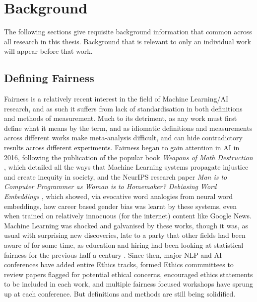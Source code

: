 \chapter{Background}\label{chapter:background}

The following sections give requisite background information that common across all research in this thesis. Background that is relevant to only an individual work will appear before that work.

\section{Defining Fairness}
Fairness is a relatively recent interest in the field of Machine Learning/AI research, and as such it suffers from lack of standardisation in both definitions and methods of measurement. Much to its detriment, as any work must first define what it means by the term, and as idiomatic definitions and measurements across different works make meta-analysis difficult, and can hide contradictory results across different experiments. Fairness began to gain attention in AI in 2016, following the publication of the popular book \textit{Weapons of Math Destruction} \citep{oneil2016weapons}, which detailed all the ways that Machine Learning systems propagate injustice and create inequity in society, and the NeurIPS research paper \textit{Man is to Computer Programmer as Woman is to Homemaker? Debiasing Word Embeddings} \citep{bolukbasi}, which showed, via evocative word analogies from neural word embeddings, how career based gender bias was learnt by these systems, even when trained on relatively innocuous (for the internet) content like Google News. Machine Learning was shocked and galvanised by these works, though it was, as usual with surprising new discoveries, late to a party that other fields had been aware of for some time, as education and hiring had been looking at statistical fairness for the previous half a century \citep{hutchinson_mitchell_2019}. Since then, major NLP and AI conferences have added entire Ethics tracks, formed Ethics commmittees to review papers flagged for potential ethical concerns, encouraged ethics statements to be included in each work, and multiple fairness focused workshops have sprung up at each conference. But definitions and methods are still being solidified.


